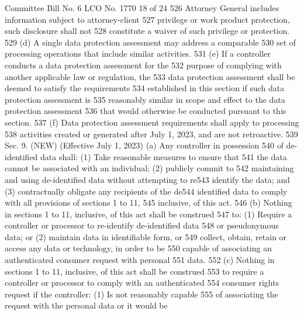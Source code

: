 Committee Bill No. 6
LCO No. 1770 18 of 24
526 Attorney General includes information subject to attorney-client
527 privilege or work product protection, such disclosure shall not
528 constitute a waiver of such privilege or protection.
529 (d) A single data protection assessment may address a comparable
530 set of processing operations that include similar activities.
531 (e) If a controller conducts a data protection assessment for the
532 purpose of complying with another applicable law or regulation, the
533 data protection assessment shall be deemed to satisfy the requirements
534 established in this section if such data protection assessment is
535 reasonably similar in scope and effect to the data protection assessment
536 that would otherwise be conducted pursuant to this section.
537 (f) Data protection assessment requirements shall apply to processing
538 activities created or generated after July 1, 2023, and are not retroactive.
539 Sec. 9. (NEW) (Effective July 1, 2023) (a) Any controller in possession
540 of de-identified data shall: (1) Take reasonable measures to ensure that
541 the data cannot be associated with an individual; (2) publicly commit to
542 maintaining and using de-identified data without attempting to re543 identify the data; and (3) contractually obligate any recipients of the de544 identified data to comply with all provisions of sections 1 to 11,
545 inclusive, of this act.
546 (b) Nothing in sections 1 to 11, inclusive, of this act shall be construed
547 to: (1) Require a controller or processor to re-identify de-identified data
548 or pseudonymous data; or (2) maintain data in identifiable form, or
549 collect, obtain, retain or access any data or technology, in order to be
550 capable of associating an authenticated consumer request with personal
551 data.
552 (c) Nothing in sections 1 to 11, inclusive, of this act shall be construed
553 to require a controller or processor to comply with an authenticated
554 consumer rights request if the controller: (1) Is not reasonably capable
555 of associating the request with the personal data or it would be 

